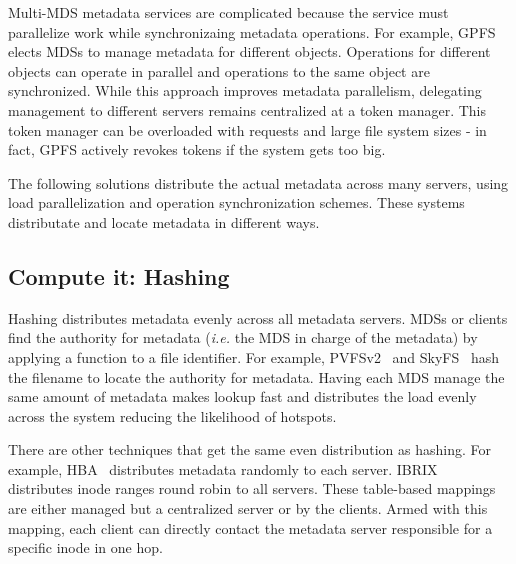 Multi-MDS metadata services are complicated because the service must parallelize work while synchronizaing metadata operations.  For example, GPFS~\cite{schmuck:fast2002-gpfs} elects MDSs to manage metadata for different objects. Operations for different objects can operate in parallel and operations to the same object are synchronized. While this approach improves metadata parallelism, delegating management to different servers remains centralized at a token manager. This token manager can be overloaded with requests and large file system sizes - in fact, GPFS actively revokes tokens if the system gets too big.

The following solutions distribute the actual metadata across many servers, using load parallelization and operation synchronization schemes. These systems distributate and locate metadata in different ways.



\subsection{Compute it: Hashing}
Hashing distributes metadata evenly across all metadata servers. MDSs or clients find the authority for metadata ({\it i.e.} the MDS in charge of the metadata) by applying a function to a file identifier. For example, PVFSv2~\cite{hildebrand:msst2005-pnfs} and SkyFS~\cite{xing:sc2009-skyfs} hash the filename to locate the authority for metadata. Having each MDS manage the same amount of metadata makes lookup fast and distributes the load evenly across the system reducing the likelihood of hotspots.

There are other techniques that get the same even distribution as hashing. For example, HBA~\cite{zhu:pds2008-hba} distributes metadata randomly to each server. IBRIX~\cite{hp:whitepaper2012-storeall} distributes inode ranges round robin to all servers. These table-based mappings are either managed but a centralized server or by the clients. Armed with this mapping, each client can directly contact the metadata server responsible for a specific inode in one hop. 

